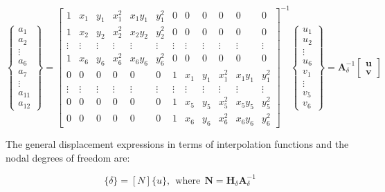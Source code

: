 \begin{equation}
\left\lbrace \begin{array}{c}
a_1 \\
a_2 \\
\vdots \\
a_6 \\
a_7 \\
\vdots \\
a_{11} \\
a_{12}
\end{array} \right\rbrace = \begin{bmatrix}
1 & x_1 & y_1 & x_1^2 & x_1 y_1 & y_1^2 & 0 & 0 & 0 & 0 & 0 & 0 \\ 
1 & x_2 & y_2 & x_2^2 & x_2 y_2 & y_2^2 & 0 & 0 & 0 & 0 & 0 & 0 \\ 
\vdots & \vdots & \vdots & \vdots & \vdots & \vdots & \vdots & \vdots & \vdots & \vdots & \vdots & \vdots \\ 
1 & x_6 & y_6 & x_6^2 & x_6 y_6 & y_6^2 & 0 & 0 & 0 & 0 & 0 & 0 \\ 
0 & 0 & 0 & 0 & 0 & 0 & 1 & x_1 & y_1 & x_1^2 & x_1 y_1 & y_1^2 \\ 
\vdots & \vdots & \vdots & \vdots & \vdots & \vdots & \vdots & \vdots & \vdots & \vdots & \vdots & \vdots \\ 
0 & 0 & 0 & 0 & 0 & 0 & 1 & x_5 & y_5 & x_5^2 & x_5 y_5 & y_5^2 \\ 
0 & 0 & 0 & 0 & 0 & 0 & 1 & x_6 & y_6 & x_6^2 & x_6 y_6 & y_6^2
\end{bmatrix} ^ {-1} \left\lbrace \begin{array}{c}
u_1 \\
u_2 \\
\vdots \\
u_6 \\
v_1 \\
\vdots \\
v_5 \\
v_6 \end{array} \right\rbrace = \mathbf{A}_\delta^{-1} \begin{bmatrix}
\mathbf{u} \\
\mathbf{v}
\end{bmatrix}
\end{equation}

The general displacement expressions in terms of interpolation functions and the nodal degrees of freedom are:

\begin{equation}
\{\delta \} = [N] \{ u \},~~\mathrm{where}~~\mathbf{N} = \mathbf{H}_\delta \mathbf{A}_\delta^{-1}
\end{equation}

